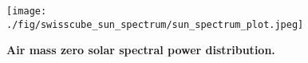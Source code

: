 
\begin{figure}[t]
    \begin{center}
    \texttt{[image: ./fig/swisscube\_sun\_spectrum/sun\_spectrum\_plot.jpeg]}
    \end{center}
    \vspace{-6mm}
    \caption{{\bf Air mass zero solar spectral power distribution.} 
    }
    \label{fig:swisscube_sun_spectrum}
\end{figure}
